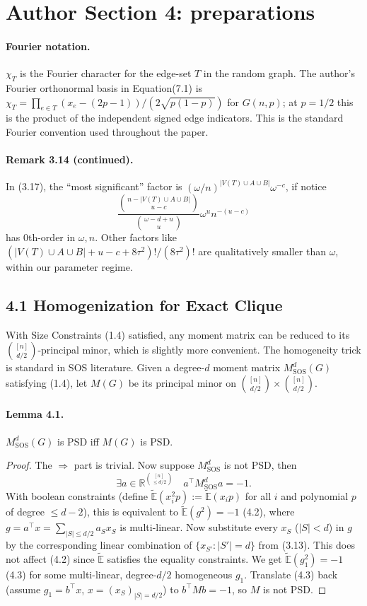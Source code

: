 \section*{Author Section 4: preparations}
\paragraph{Fourier notation.} $\chi_T$ is the Fourier character for the edge-set $T$ in the random graph. The author's Fourier orthonormal basis in Equation(7.1) is $\chi_T=\prod_{e\in T}(x_e-(2p-1))/(2\sqrt{p(1-p)})$ for $G(n,p)$; at $p=1/2$ this is the product of the independent signed edge indicators. This is the standard Fourier convention used throughout the paper.
\paragraph{Remark 3.14 (continued).} In (3.17), the ``most significant'' factor is $(\omega/n)^{|V(T)\cup A\cup B|}\omega^{-c}$, if notice
\[\frac{\binom{n-|V(T)\cup A\cup B|}{u-c}}{\binom{\omega-d+u}u}\omega^un^{-(u-c)}\]
has 0th-order in $\omega,n$. Other factors like $(|V(T)\cup A\cup B|+u-c+8\tau^2)!/(8\tau^2)!$ are qualitatively smaller than $\omega$, within our parameter regime.
\subsection*{4.1 Homogenization for Exact Clique}
With Size Constraints (1.4) satisfied, any moment matrix can be reduced to its $\binom{[n]}{d/2}$-principal minor, which is slightly more convenient. The homogeneity trick is standard in SOS literature. Given a degree-$d$ moment matrix $M^d_{\mathrm{SOS}}(G)$ satisfying (1.4), let $M(G)$ be its principal minor on $\binom{[n]}{d/2}\times\binom{[n]}{d/2}$.
\paragraph{Lemma 4.1.} $M^d_{\mathrm{SOS}}(G)$ is PSD iff $M(G)$ is PSD.
\begin{proof}The $\Rightarrow$ part is trivial. Now suppose $M^d_{\mathrm{SOS}}$ is not PSD, then
\[\exists a\in\mathbb R^{\binom{[n]}{\le d/2}}\quad a^\top M^d_{\mathrm{SOS}}a=-1.\tag{4.1}\]
With boolean constraints (define $\widetilde{\mathbb E}(x_i^2p):=\widetilde{\mathbb E}(x_ip)$ for all $i$ and polynomial $p$ of degree $\le d-2$), this is equivalent to $\widetilde{\mathbb E}(g^2)=-1$ (4.2), where $g=a^\top x=\sum_{|S|\le d/2}a_Sx_S$ is multi-linear. Now substitute every $x_S$ ($|S|<d$) in $g$ by the corresponding linear combination of $\{x_{S'}:|S'|=d\}$ from (3.13). This does not affect (4.2) since $\widetilde{\mathbb E}$ satisfies the equality constraints. We get $\widetilde{\mathbb E}(g_1^2)=-1$ (4.3) for some multi-linear, degree-$d/2$ homogeneous $g_1$. Translate (4.3) back (assume $g_1=b^\top x$, $x=(x_S)_{|S|=d/2}$) to $b^\top Mb=-1$, so $M$ is not PSD.\end{proof}
